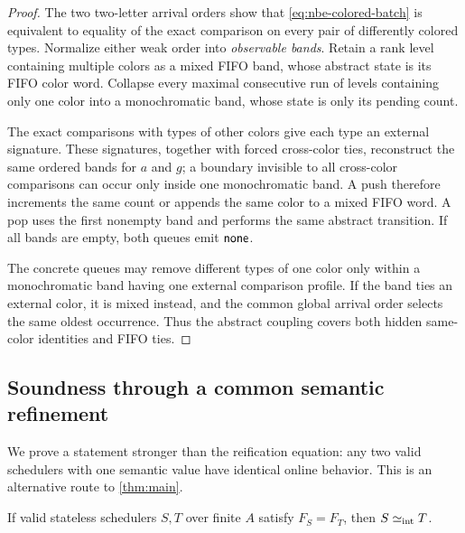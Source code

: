 \begin{proof}
The two two-letter arrival orders show that
\autoref{eq:nbe-colored-batch} is equivalent to equality of the exact comparison
on every pair of differently colored types.  Normalize either weak order into
\emph{observable bands}.  Retain a rank level containing multiple colors as a
mixed FIFO band, whose abstract state is its FIFO color word.  Collapse every
maximal consecutive run of levels containing only one color into a
monochromatic band, whose state is only its pending count.

The exact comparisons with types of other colors give each type an external
signature.  These signatures, together with forced cross-color ties,
reconstruct the same ordered bands for \(a\) and \(g\); a boundary invisible
to all cross-color comparisons can occur only inside one monochromatic band.
A push therefore increments the same count or appends the same color to a
mixed FIFO word.  A pop uses the first nonempty band and performs the same
abstract transition.  If all bands are empty, both queues emit \(\mathsf{none}\).

The concrete queues may remove different types of one color only within a
monochromatic band having one external comparison profile.  If the band ties
an external color, it is mixed instead, and the common global arrival order
selects the same oldest occurrence.  Thus the abstract coupling covers both
hidden same-color identities and FIFO ties.
\end{proof}

\subsection{Soundness through a common semantic refinement}

We prove a statement stronger than the reification equation: any two valid
schedulers with one semantic value have identical online behavior.  This is
an alternative route to \autoref{thm:main}.

\begin{theorem}
\label{thm:nbe-common-refinement}
If valid stateless schedulers \(S,T\) over finite \(A\) satisfy
\(F_S=F_T\), then \(S\mathrel{\simeq_{\mathrm{int}}} T\).
\end{theorem}

